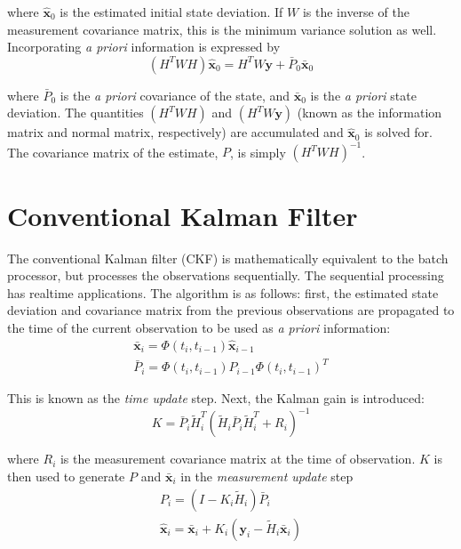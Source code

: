 \documentclass[]{aiaa-tc}%
\begin{document}
	\noindent where $\hat{\mathbf{x}}_0$ is the estimated initial state deviation. If $W$ is the inverse of the measurement covariance matrix, this is the minimum variance solution as well. Incorporating \textit{a priori} information is expressed by
	\begin{equation} \label{eq:BLS_ap}
	(H^TWH)\hat{\mathbf{x}}_0=H^TW\mathbf{y} +\bar{P}_0\bar{\mathbf{x}}_0
	\end{equation}

	\noindent where $\bar{P}_0$ is the \textit{a priori} covariance of the state, and $\bar{\mathbf{x}}_0$ is the \textit{a priori} state deviation. The quantities $(H^TWH)$ and $(H^TW\mathbf{y})$ (known as the information matrix and normal matrix, respectively) are accumulated and $\hat{\mathbf{x}}_0$ is solved for.  The covariance matrix of the estimate, $P$, is simply $(H^TWH)^{-1}$. 
	
	\section{Conventional Kalman Filter}
	
	The conventional Kalman filter (CKF) is mathematically equivalent to the batch processor, but processes the observations sequentially. The sequential processing has realtime applications. The algorithm is as follows: first, the estimated state deviation and covariance matrix from the previous observations are propagated to the time of the current observation to be used as \textit{a priori} information:
	\begin{equation}
	\begin{matrix}
	\bar{\mathbf{x}}_i=\Phi(t_i,t_{i-1})\hat{\mathbf{x}}_{i-1} \\
	\bar{P}_i=\Phi(t_i,t_{i-1}) P_{i-1} \Phi(t_i,t_{i-1})^T
	\end{matrix}
	\end{equation}

	\noindent This is known as the \textit{time update} step. Next, the Kalman gain is introduced:
	\begin{equation}
	K=\bar{P}_i\tilde{H}_i^T(\tilde{H}_i\bar{P}_i\tilde{H}_i^T+R_i)^{-1}
	\end{equation}

	\noindent where $R_i$ is the measurement covariance matrix at the time of observation. $K$ is then used to generate $P$ and $\bar{\mathbf{x}}_i$ in the \textit{measurement update} step
	\begin{equation}
	\begin{matrix}
	P_i=(I-K_i\tilde{H}_i)\bar{P}_i \\
	\hat{\mathbf{x}}_i=\bar{\mathbf{x}}_i+K_i(\mathbf{y}_i-\tilde{H}_i\bar{\mathbf{x}}_i)
	\label{eqn:MeasUpdate}
	\end{matrix}
	\end{equation}
\end{document}
